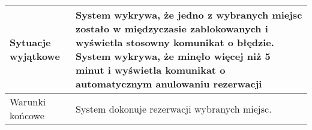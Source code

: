 \begin{tabularx}{\textwidth}{|l|X|}
Sytuacje wyjątkowe     & System wykrywa, że jedno z wybranych miejsc zostało w międzyczasie zablokowanych i wyświetla stosowny komunikat o błędzie.                                                                                                                                                                                                                                                                                                      \newline System wykrywa, że minęło więcej niż 5 minut i wyświetla komunikat o automatycznym anulowaniu rezerwacji \\ \hline
Warunki końcowe        & System dokonuje rezerwacji wybranych miejsc.                                                                                                                                                                                                                                                                                                                                                                                                         \\ \hline
\end{tabularx}
\newpage
